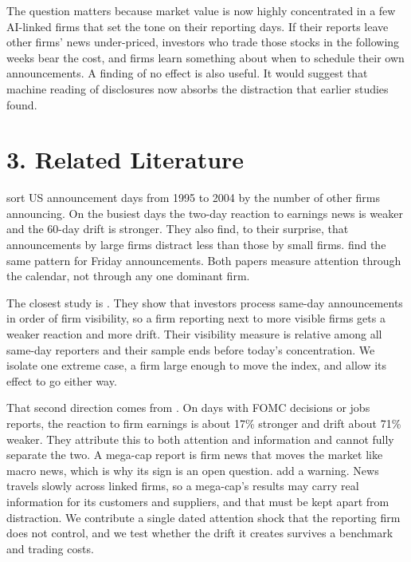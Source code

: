 \documentclass[11pt]{article}
\begin{document}
The question matters because market value is now highly concentrated in a few AI-linked firms that set the tone on their reporting days. If their reports leave other firms' news under-priced, investors who trade those stocks in the following weeks bear the cost, and firms learn something about when to schedule their own announcements. A finding of no effect is also useful. It would suggest that machine reading of disclosures now absorbs the distraction that earlier studies found.

\section*{3. Related Literature}

\citet{hirshleifer2009driven} sort US announcement days from 1995 to 2004 by the number of other firms announcing. On the busiest days the two-day reaction to earnings news is weaker and the 60-day drift is stronger. They also find, to their surprise, that announcements by large firms distract less than those by small firms. \citet{dellavigna2009investor} find the same pattern for Friday announcements. Both papers measure attention through the calendar, not through any one dominant firm.

The closest study is \citet{frederickson2016competing}. They show that investors process same-day announcements in order of firm visibility, so a firm reporting next to more visible firms gets a weaker reaction and more drift. Their visibility measure is relative among all same-day reporters and their sample ends before today's concentration. We isolate one extreme case, a firm large enough to move the index, and allow its effect to go either way.

That second direction comes from \citet{hirshleifer2022macro}. On days with FOMC decisions or jobs reports, the reaction to firm earnings is about 17\% stronger and drift about 71\% weaker. They attribute this to both attention and information and cannot fully separate the two. A mega-cap report is firm news that moves the market like macro news, which is why its sign is an open question. \citet{cohen2008economic} add a warning. News travels slowly across linked firms, so a mega-cap's results may carry real information for its customers and suppliers, and that must be kept apart from distraction. We contribute a single dated attention shock that the reporting firm does not control, and we test whether the drift it creates survives a benchmark and trading costs.
\end{document}
